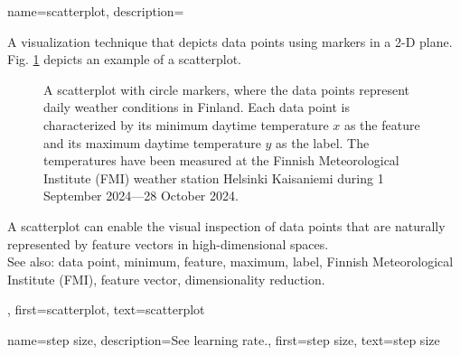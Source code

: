 {
{name={scatterplot}, 
	description={A 
		visualization technique that depicts data points using markers in a 2-D plane. 
		Fig. \ref{fig_scatterplot_temp_FMI_dict} depicts an example of a scatterplot.  
		\begin{figure}[H]
			\begin{center}
				\vspace*{-10mm}
			\end{center}
			\caption{A scatterplot with circle markers, where the data points represent daily weather conditions in Finland. 
				Each data point is characterized by its minimum daytime temperature $x$ 
				as the feature and its maximum daytime temperature $y$ as the label. 
				The temperatures have been measured at the Finnish Meteorological Institute (FMI) weather station Helsinki Kaisaniemi 
				during 1 September 2024—28 October 2024.}
			\label{fig_scatterplot_temp_FMI_dict}
			\vspace*{-3mm}
			\end{figure}
		A scatterplot can enable the visual inspection of data points that are naturally 
		represented by feature vectors in high-dimensional spaces.
		\\
		See also: data point, minimum, feature, maximum, label, Finnish Meteorological Institute (FMI), feature vector, dimensionality reduction.},
	first={scatterplot},
	text={scatterplot} 
}


{name={step size}, 
	description={See learning rate.}, 
	first={step size},
	text={step size} 
}

}
